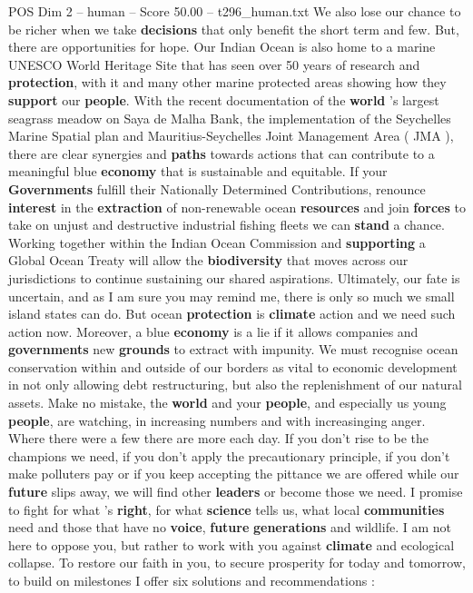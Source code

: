 \begin{textsample}{POS Dim 2 – human – Score 50.00 – t296\_human.txt}
We also lose our chance to be richer when we take \textbf{decisions} that only benefit the short term and few.
But, there are opportunities for hope.
Our Indian Ocean is also home to a marine UNESCO World Heritage Site that has seen over 50 years of research and \textbf{protection}, with it and many other marine protected areas showing how they \textbf{support} our \textbf{people}.
With the recent documentation of the \textbf{world} ’s largest seagrass meadow on Saya de Malha Bank, the implementation of the Seychelles Marine Spatial plan and Mauritius-Seychelles Joint Management Area ( JMA ), there are clear synergies and \textbf{paths} towards actions that can contribute to a meaningful blue \textbf{economy} that is sustainable and equitable.
If your \textbf{Governments} fulfill their Nationally Determined Contributions, renounce \textbf{interest} in the \textbf{extraction} of non-renewable ocean \textbf{resources} and join \textbf{forces} to take on unjust and destructive industrial fishing fleets we can \textbf{stand} a chance.
Working together within the Indian Ocean Commission and \textbf{supporting} a Global Ocean Treaty will allow the \textbf{biodiversity} that moves across our jurisdictions to continue sustaining our shared aspirations.
Ultimately, our fate is uncertain, and as I am sure you may remind me, there is only so much we small island states can do.
But ocean \textbf{protection} is \textbf{climate} action and we need such action now.
Moreover, a blue \textbf{economy} is a lie if it allows companies and \textbf{governments} new \textbf{grounds} to extract with impunity.
We must recognise ocean conservation within and outside of our borders as vital to economic development in not only allowing debt restructuring, but also the replenishment of our natural assets.
Make no mistake, the \textbf{world} and your \textbf{people}, and especially us young \textbf{people}, are watching, in increasing numbers and with increasinging anger.
Where there were a few there are more each day.
If you don't rise to be the champions we need, if you don't apply the precautionary principle, if you don't make polluters pay or if you keep accepting the pittance we are offered while our \textbf{future} slips away, we will find other \textbf{leaders} or become those we need.
I promise to fight for what ’s \textbf{right}, for what \textbf{science} tells us, what local \textbf{communities} need and those that have no \textbf{voice}, \textbf{future} \textbf{generations} and wildlife.
I am not here to oppose you, but rather to work with you against \textbf{climate} and ecological collapse.
To restore our faith in you, to secure prosperity for today and tomorrow, to build on milestones I offer six solutions and recommendations :


\end{textsample}
